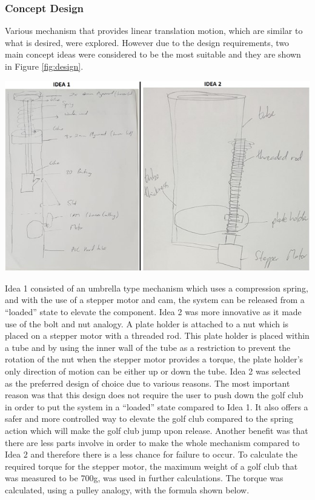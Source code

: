 \documentclass[11pt,landscape]{article}
\newenvironment{Figure}
  {\par\medskip\noindent\minipage{\linewidth}}
  {\endminipage\par\medskip}
\begin{document}
\begin{multicols}{2}
    \subsubsection{Concept Design}
    Various mechanism that provides linear translation motion, which are similar
    to what is desired, were explored. However due to the design requirements,
    two main concept ideas were considered to be the most suitable and they are
    shown in Figure \ref{fig:design}.
    
    \begin{Figure}
        \begin{center}
            \includegraphics[width=\textwidth]{Figure19.jpg}
            \label{fig:design}
        \end{center}
    \end{Figure}
    
    
    Idea 1 consisted of an umbrella type mechanism which uses a compression
    spring, and with the use of a stepper motor and cam, the system can be
    released from a “loaded” state to elevate the component. Idea 2 was more
    innovative as it made use of the bolt and nut analogy. A plate holder is
    attached to a nut which is placed on a stepper motor with a threaded rod.
    This plate holder is placed within a tube and by using the inner wall of the
    tube as a restriction to prevent the rotation of the nut when the stepper
    motor provides a torque, the plate holder’s only direction of motion can be
    either up or down the tube. Idea 2 was selected as the preferred design of
    choice due to various reasons. The most important reason was that this
    design does not require the user to push down the golf club in order to put
    the system in a “loaded” state compared to Idea 1. It also offers a safer
    and more controlled way to elevate the golf club compared to the spring
    action which will make the golf club jump upon release. Another benefit was
    that there are less parts involve in order to make the whole mechanism
    compared to Idea 2 and therefore there is a less chance for failure to
    occur. To calculate the required torque for the stepper motor, the maximum
    weight of a golf club that was measured to be 700g, was used in further
    calculations. The torque was calculated, using a pulley analogy, with the
    formula shown below.
    

\end{multicols}
\end{document}
